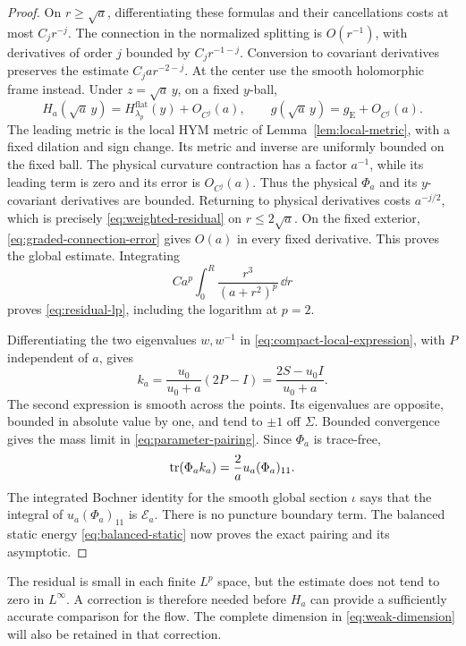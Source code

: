 \begin{proof}
On \(r\ge\sqrt a\), differentiating these formulas and their
cancellations costs at most \(C_jr^{-j}\). The connection in
the normalized splitting is \(O(r^{-1})\), with derivatives
of order \(j\) bounded by \(C_jr^{-1-j}\). Conversion to
covariant derivatives preserves the estimate
\(C_jar^{-2-j}\). At the center use the smooth holomorphic
frame instead. Under \(z=\sqrt a\,y\), on a fixed \(y\)-ball,
\[
 H_a(\sqrt a\,y)=H^{\mathrm{flat}}_{\lambda_p}(y)+O_{C^j}(a),
 \qquad g(\sqrt a\,y)=g_{\mathrm E}+O_{C^j}(a).
\]
The leading metric is the local HYM metric of
Lemma~\ref{lem:local-metric}, with a fixed dilation and sign
change. Its metric and inverse are uniformly bounded on
the fixed ball. The physical curvature contraction has a
factor \(a^{-1}\), while its leading term is zero and its
error is \(O_{C^j}(a)\). Thus the physical \(\Phi_a\) and its
\(y\)-covariant derivatives are bounded. Returning to physical
derivatives costs \(a^{-j/2}\), which is precisely
\eqref{eq:weighted-residual} on \(r\le2\sqrt a\).
On the fixed exterior, \eqref{eq:graded-connection-error}
gives \(O(a)\) in every fixed derivative. This proves the
global estimate. Integrating
\[
 Ca^p\int_0^R\frac{r^3}{(a+r^2)^p}\,\dd r
\]
proves \eqref{eq:residual-lp}, including the logarithm at \(p=2\).

Differentiating the two eigenvalues \(w,w^{-1}\) in
\eqref{eq:compact-local-expression}, with \(P\) independent
of \(a\), gives
\[
 k_a=\frac{u_0}{u_0+a}(2P-I)=\frac{2S-u_0I}{u_0+a}.
\]
The second expression is smooth across the points. Its
eigenvalues are opposite, bounded in absolute value by one,
and tend to \(\pm1\) off \(\Sigma\). Bounded convergence gives
the mass limit in \eqref{eq:parameter-pairing}. Since \(\Phi_a\)
is trace-free,
\[
 \operatorname{tr}(\Phi_ak_a)=\frac2a u_a(\Phi_a)_{11}.
\]
The integrated Bochner identity for the smooth global section
\(\iota\) says that the integral of \(u_a(\Phi_a)_{11}\) is
\(\mathcal E_a\). There is no puncture boundary term. The
balanced static energy \eqref{eq:balanced-static} now proves
the exact pairing and its asymptotic.
\end{proof}

The residual is small in each finite \(L^p\) space, but the estimate
does not tend to zero in \(L^\infty\). A correction is therefore
needed before \(H_a\) can provide a sufficiently accurate comparison
for the flow. The complete dimension in \eqref{eq:weak-dimension}
will also be retained in that correction.
